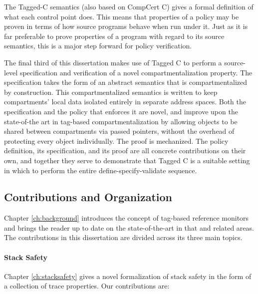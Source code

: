\documentclass{report}
\begin{document}
The Tagged-C semantics (also based on CompCert C) gives a formal definition of what each
control point does. This means that properties of a policy may be proven in terms of how
source programs behave when run under it. Just as it is far preferable to prove properties
of a program with regard to its source semantics, this is a major step forward for policy
verification.

The final third of this dissertation makes use of Tagged C to perform a source-level specification and
verification of a novel compartmentalization property. The specification takes the form of
an abstract semantics that is compartmentalized by construction. This compartmentalized semantics
is written to keep compartments' local data isolated entirely in separate address spaces.
Both the specification and the policy that enforces it are novel, and improve upon the
state-of-the art in tag-based compartmentalization by allowing objects to be shared between
compartments via passed pointers, without the overhead of protecting every object individually.
The proof is mechanized. The policy definition, its
specification, and its proof are all concrete contributions on their own, and together they
serve to demonstrate that Tagged C is a suitable setting in which to perform the entire
define-specify-validate sequence.

\subsection{Contributions and Organization}

Chapter \ref{ch:background} introduces the concept of tag-based reference monitors
and brings the reader up to date on the state-of-the-art in that and related areas.
The contributions in this dissertation are divided across its three main topics.

\paragraph{Stack Safety}

Chapter \ref{ch:stacksafety} gives a novel formalization of stack safety in the
form of a collection of trace properties. Our contributions are:
\end{document}
